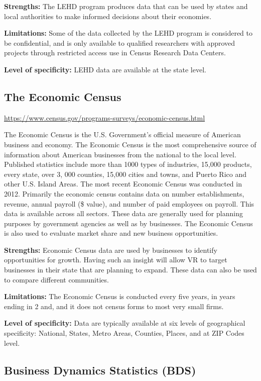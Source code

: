 \documentclass[]{book}
\theoremstyle{definition}
\theoremstyle{definition}
\theoremstyle{definition}
\theoremstyle{remark}
\begin{document}
\textbf{Strengths:} The LEHD program produces data that can be used by
states and local authorities to make informed decisions about their
economies.

\textbf{Limitations:} Some of the data collected by the LEHD program is
considered to be confidential, and is only available to qualified
researchers with approved projects through restricted access use in
Census Research Data Centers.

\textbf{Level of specificity:} LEHD data are available at the state
level.

\subsection{The Economic Census}\label{the-economic-census}

\url{https://www.census.gov/programs-surveys/economic-census.html}

The Economic Census is the U.S. Government's official measure of
American business and economy. The Economic Census is the most
comprehensive source of information about American businesses from the
national to the local level. Published statistics include more than 1000
types of industries, 15,000 products, every state, over 3, 000 counties,
15,000 cities and towns, and Puerto Rico and other U.S. Island Areas.
The most recent Economic Census was conducted in 2012. Primarily the
economic census contains data on number establishments, revenue, annual
payroll (\$ value), and number of paid employees on payroll. This data
is available across all sectors. These data are generally used for
planning purposes by government agencies as well as by businesses. The
Economic Census is also used to evaluate market share and new business
opportunities.

\textbf{Strengths:} Economic Census data are used by businesses to
identify opportunities for growth. Having such an insight will allow VR
to target businesses in their state that are planning to expand. These
data can also be used to compare different communities.

\textbf{Limitations:} The Economic Census is conducted every five years,
in years ending in 2 and, and it does not census forms to most very
small firms.

\textbf{Level of specificity:} Data are typically available at six
levels of geographical specificity: National, States, Metro Areas,
Counties, Places, and at ZIP Codes level.

\subsection{Business Dynamics Statistics
(BDS)}\label{business-dynamics-statistics-bds}
\end{document}
